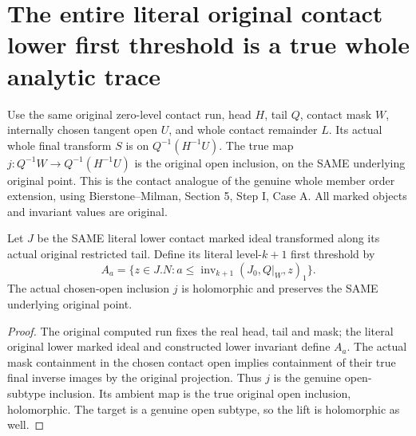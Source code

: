 \section{The entire literal original contact lower first threshold is a true whole analytic trace}

Use the same original zero-level contact run, head $H$, tail $Q$, contact mask
$W$, internally chosen tangent open $U$, and whole contact remainder $L$.
Its actual whole final transform $S$ is on $Q^{-1}(H^{-1}U)$. The true map
$j:Q^{-1}W\to Q^{-1}(H^{-1}U)$ is the original open inclusion, on the
SAME underlying original point. This is the contact analogue of the genuine
whole member order extension, using Bierstone--Milman\cite{bierstone-milman08-functoriality},
Section 5, Step I, Case A. All marked objects and invariant values are original.

\begin{definition}
\label{hir:original-all-level-contact-literal-first-threshold-definition}
\leanok
{}
Let $J$ be the SAME literal lower contact marked ideal transformed along its
actual original restricted tail. Define its literal level-$k+1$ first
threshold by
\[
 A_a=\{z\in J.N:a\leq\operatorname{inv}_{k+1}(J_0,Q|_W,z)_1\}.
\]
The actual chosen-open inclusion $j$ is holomorphic and preserves the SAME
underlying original point.
\end{definition}
\begin{proof}
The original computed run fixes the real head, tail and mask; the literal
original lower marked ideal and constructed lower invariant define $A_a$.
The actual mask containment in the chosen contact open implies containment
of their true final inverse images by the original projection. Thus $j$ is
the genuine open-subtype inclusion. Its ambient map is the true original
open inclusion, holomorphic. The target is a genuine open subtype, so the
lift is holomorphic as well.
\end{proof}

